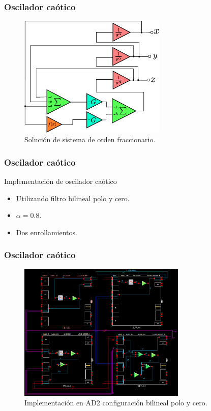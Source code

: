 \documentclass[10pt]{beamer}
\begin{document}
	\begin{frame}
		\frametitle{Oscilador caótico}
		\begin{block}{ }
		\begin{figure}[!ht]
		\caption{Solución de sistema de orden fraccionario.}
		\label{fig:Z2_bloques}
		\centering
		\includegraphics[width=7cm]{../imagenes/Z2_bloques.eps}
	\end{figure}
		\end{block}
	\end{frame}
	\begin{frame}
		\frametitle{Oscilador caótico}
		\begin{block}{Implementación de oscilador caótico}
		\begin{itemize}
			\item Utilizando filtro bilineal polo y cero.
			\item $\alpha = 0.8$.
			\item Dos enrollamientos.
		\end{itemize}
		\end{block}
	\end{frame}	
	\begin{frame}
		\frametitle{Oscilador caótico}
		\begin{figure}[!ht]
		\caption{Implementación en AD2 configuración bilineal polo y cero.} 
		\label{fig:Y1_implementacion}
		\centering
		\includegraphics[width=8cm]{../imagenes/Y1_implementacion.png}
	\end{figure}
	\end{frame}		
\end{document}
